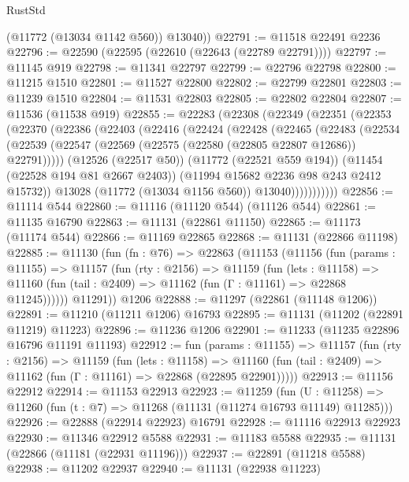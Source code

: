 \begin{lexlean}{RustStd}
\begin{coremodule}
        (@11772 (@13034 @1142 @560))
        @13040))
@22791 := @11518 @22491 @2236
@22796 := @22590 (@22595 (@22610 (@22643 (@22789 @22791))))
@22797 := @11145 @919
@22798 := @11341 @22797
@22799 := @22796 @22798
@22800 := @11215 @1510
@22801 := @11527 @22800
@22802 := @22799 @22801
@22803 := @11239 @1510
@22804 := @11531 @22803
@22805 := @22802 @22804
@22807 := @11536 (@11538 @919)
@22855 := @22283
    (@22308
      (@22349
        (@22351
          (@22353
            (@22370
              (@22386
                (@22403
                  (@22416
                    (@22424
                      (@22428
                        (@22465
                          (@22483
                            (@22534
                              (@22539
                                (@22547 (@22569 (@22575 (@22580 (@22805 @22807 @12686)) @22791)))))
                            (@12526 (@22517 @50))
                            (@11772 (@22521 @559 @194))
                            (@11454 (@22528 @194 @81 @2667 @2403))
                            (@11994 @15682 @2236 @98 @243 @2412 @15732))
                          @13028
                          (@11772 (@13034 @1156 @560))
                          @13040)))))))))))
@22856 := @11114 @544
@22860 := @11116 (@11120 @544) (@11126 @544)
@22861 := @11135 @16790
@22863 := @11131 (@22861 @11150)
@22865 := @11173 (@11174 @544)
@22866 := @11169 @22865
@22868 := @11131 (@22866 @11198)
@22885 := @11130
    (fun (fn : @76) =>
    @22863
      (@11153
        (@11156
          (fun (params : @11155) =>
          @11157
            (fun (rty : @2156) =>
            @11159
              (fun (lets : @11158) =>
              @11160 (fun (tail : @2409) => @11162 (fun (Γ : @11161) => @22868 @11245))))))
        @11291))
    @1206
@22888 := @11297 (@22861 (@11148 @1206))
@22891 := @11210 (@11211 @1206) @16793
@22895 := @11131 (@11202 (@22891 @11219) @11223)
@22896 := @11236 @1206
@22901 := @11233 (@11235 @22896 @16796 @11191 @11193)
@22912 := fun (params : @11155) =>
  @11157
    (fun (rty : @2156) =>
    @11159
      (fun (lets : @11158) =>
      @11160 (fun (tail : @2409) => @11162 (fun (Γ : @11161) => @22868 (@22895 @22901)))))
@22913 := @11156 @22912
@22914 := @11153 @22913
@22923 := @11259
    (fun (U : @11258) => @11260 (fun (t : @7) => @11268 (@11131 (@11274 @16793 @11149) @11285)))
@22926 := @22888 (@22914 @22923) @16791
@22928 := @11116 @22913 @22923
@22930 := @11346 @22912 @5588
@22931 := @11183 @5588
@22935 := @11131 (@22866 (@11181 (@22931 @11196)))
@22937 := @22891 (@11218 @5588)
@22938 := @11202 @22937
@22940 := @11131 (@22938 @11223)

\end{coremodule}
\end{lexlean}
